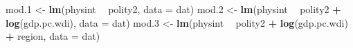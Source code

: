 \documentclass[]{book}
\newenvironment{Shaded}{\begin{snugshade}}{\end{snugshade}}
\newcommand{\DataTypeTok}[1]{\textcolor[rgb]{0.13,0.29,0.53}{#1}}
\newcommand{\FloatTok}[1]{\textcolor[rgb]{0.00,0.00,0.81}{#1}}
\newcommand{\KeywordTok}[1]{\textcolor[rgb]{0.13,0.29,0.53}{\textbf{#1}}}
\newcommand{\NormalTok}[1]{#1}
\newcommand{\OperatorTok}[1]{\textcolor[rgb]{0.81,0.36,0.00}{\textbf{#1}}}
\newcommand{\StringTok}[1]{\textcolor[rgb]{0.31,0.60,0.02}{#1}}
\begin{document}
\begin{Shaded}
\begin{Highlighting}[]
\NormalTok{mod}\FloatTok{.1}\NormalTok{ <-}\StringTok{ }\KeywordTok{lm}\NormalTok{(physint }\OperatorTok{~}\StringTok{ }\NormalTok{polity2, }\DataTypeTok{data =}\NormalTok{ dat)}
\NormalTok{mod}\FloatTok{.2}\NormalTok{ <-}\StringTok{ }\KeywordTok{lm}\NormalTok{(physint }\OperatorTok{~}\StringTok{ }\NormalTok{polity2 }\OperatorTok{+}\StringTok{ }\KeywordTok{log}\NormalTok{(gdp.pc.wdi), }\DataTypeTok{data =}\NormalTok{ dat)}
\NormalTok{mod}\FloatTok{.3}\NormalTok{ <-}\StringTok{ }\KeywordTok{lm}\NormalTok{(physint }\OperatorTok{~}\StringTok{ }\NormalTok{polity2 }\OperatorTok{+}\StringTok{ }\KeywordTok{log}\NormalTok{(gdp.pc.wdi) }\OperatorTok{+}\StringTok{ }\NormalTok{region, }\DataTypeTok{data =}\NormalTok{ dat)}


\end{Highlighting}
\end{Shaded}
\end{document}
